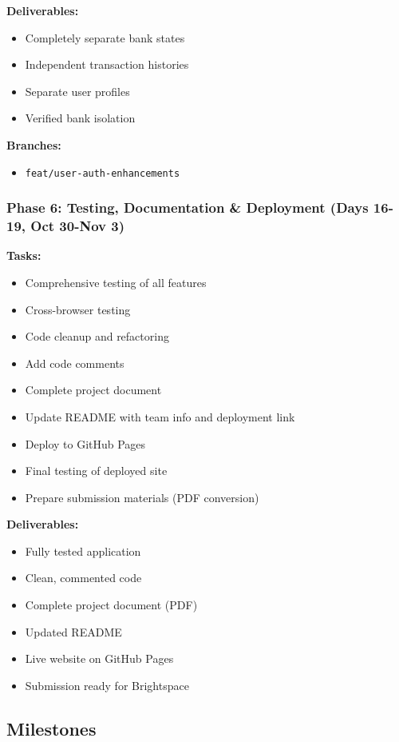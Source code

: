 \documentclass[11pt,a4paper]{article}
\begin{document}
\textbf{Deliverables:}
\begin{itemize}[leftmargin=*]
    \item Completely separate bank states
    \item Independent transaction histories
    \item Separate user profiles
    \item Verified bank isolation
\end{itemize}

\textbf{Branches:}
\begin{itemize}[leftmargin=*]
    \item \texttt{feat/user-auth-enhancements}
\end{itemize}

\subsubsection{Phase 6: Testing, Documentation \& Deployment (Days 16-19, Oct 30-Nov 3)}
\textbf{Tasks:}
\begin{itemize}[leftmargin=*]
    \item Comprehensive testing of all features
    \item Cross-browser testing
    \item Code cleanup and refactoring
    \item Add code comments
    \item Complete project document
    \item Update README with team info and deployment link
    \item Deploy to GitHub Pages
    \item Final testing of deployed site
    \item Prepare submission materials (PDF conversion)
\end{itemize}

\textbf{Deliverables:}
\begin{itemize}[leftmargin=*]
    \item Fully tested application
    \item Clean, commented code
    \item Complete project document (PDF)
    \item Updated README
    \item Live website on GitHub Pages
    \item Submission ready for Brightspace
\end{itemize}

\subsection{Milestones}
\end{document}
